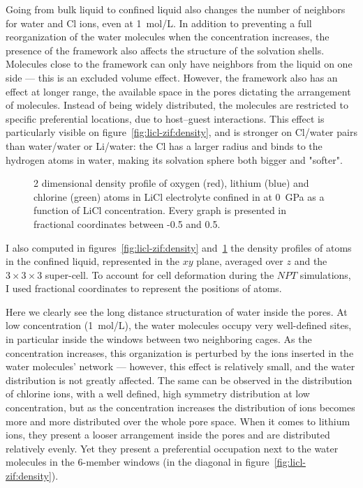 \documentclass[thesis]{subfiles}
\begin{document}
Going from bulk liquid to confined liquid also changes the number of neighbors
for water and Cl ions, even at \SI{1}{mol/L}. In addition to preventing a full
reorganization of the water molecules when the concentration increases, the
presence of the framework also affects the structure of the solvation shells.
Molecules close to the framework can only have neighbors from the liquid on one
side --- this is an excluded volume effect. However, the framework also has an
effect at longer range, the available space in the pores dictating the
arrangement of molecules. Instead of being widely distributed, the molecules are
restricted to specific preferential locations, due to host--guest interactions.
This effect is particularly visible on figure~\ref{fig:licl-zif:density}, and is
stronger on Cl/water pairs than water/water or Li/water: the Cl has a larger
radius and binds to the hydrogen atoms in water, making its solvation sphere
both bigger and "softer".

\begin{figure}[p]
    \centering
    
    \caption{2 dimensional density profile of oxygen (red), lithium (blue) and
    chlorine (green) atoms in LiCl electrolyte confined in  at \SI{0}{GPa}
    as a function of LiCl concentration. Every graph is presented in fractional
    coordinates between -0.5 and 0.5.}
    \label{fig:licl-zif:density:all}
\end{figure}

I also computed in figures~\ref{fig:licl-zif:density}
and~\ref{fig:licl-zif:density:all} the density profiles of atoms in the confined
liquid, represented in the $xy$ plane, averaged over $z$ and the
$3\times3\times3$ super-cell. To account for cell deformation during the $NPT$
simulations, I used fractional coordinates to represent the positions of atoms.

Here we clearly see the long distance structuration of water inside the 
pores. At low concentration (\SI{1}{mol/L}), the water molecules occupy very
well-defined sites, in particular inside the windows between two neighboring
cages. As the concentration increases, this organization is perturbed by the
ions inserted in the water molecules' network --- however, this effect is
relatively small, and the water distribution is not greatly affected. The same
can be observed in the distribution of chlorine ions, with a well defined, high
symmetry distribution at low concentration, but as the concentration increases
the distribution of ions becomes more and more distributed over the whole pore
space. When it comes to lithium ions, they present a looser arrangement inside
the pores and are distributed relatively evenly. Yet they present a
preferential occupation next to the water molecules in the 6-member windows (in
the diagonal in figure~\ref{fig:licl-zif:density}).
\end{document}
